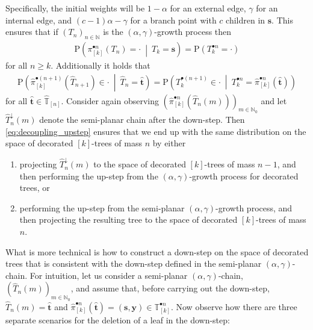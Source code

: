 \documentclass[a4paper, final]{amsart}
\theoremstyle{plain}
\theoremstyle{definition}
\newcommand{\tree}[1][t]{\boldsymbol{#1}}
\newcommand{\that}[1][t]{\hat{\boldsymbol{#1}}} %
\newcommand{\That}[1][T]{\widehat{#1}}
\newcommand{\Thatspace}[1][\T]{\widehat{\boldsymbol{#1}}} %
\newcommand{\T}{\mathbb{T}}
\newcommand{\nin}{{n \in \mathbb{N}}}
\renewcommand{\P}{\mathrm{P}}
\newcommand{\N}{\mathbb{N}}
\begin{document}
Specifically, the initial weights will be $1-\alpha$ for an external edge, $\gamma$ for an internal edge, and $(c-1)\alpha - \gamma$ for a branch point with $c$ children in $\tree[s]$.
This ensures that if ${ \left( T_n \right) }_\nin$ is the $(\alpha, \gamma)$-growth process then
%
\begin{align*}
  \P \left( \pi_{[k]}^{\bullet n} (T_n) = \cdot \ \middle \vert \ T_k = \tree[s] \right)
  = \P \left( T_k^{\bullet n} = \cdot \right)
\end{align*}
%
for all $n \geq k$.
Additionally it holds that
%
\begin{align}
  \P \left( \hat{\pi}_{[k]}^{\bullet (n+1)} \left( \That_{n+1} \right) \in \cdot \ \middle \vert \ \That_n = \that \right)
  = \P \left( T_k^{\bullet (n+1)} \in \cdot \ \middle \vert \ T_k^{\bullet n} = \hat{\pi}_{[k]}^{\bullet n} (\that) \right)
  \label{eq:decoupling_upstep}
\end{align}
%
for all $\that \in \Thatspace_{[n]}$.
Consider again observing ${\left( \hat{\pi}_{[k]}^{\bullet n} \left( \That_n(m) \right) \right)}_{m \in \N_0}$ and let $\That_n^\downarrow(m)$ denote the semi-planar chain after the down-step.
Then \eqref{eq:decoupling_upstep} ensures that we end up with the same distribution on the space of decorated $[k]$-trees of mass $n$ by either
%
\begin{enumerate}
  \item projecting $\That_n^\downarrow(m)$ to the space of decorated $[k]$-trees of mass $n-1$, and then performing the up-step from the $(\alpha, \gamma)$-growth process for decorated trees, or
  \item performing the up-step from the semi-planar $(\alpha, \gamma)$-growth process, and then projecting the resulting tree to the space of decorated $[k]$-trees of mass $n$.
\end{enumerate}
%
What is more technical is how to construct a down-step on the space of decorated trees that is consistent with the down-step defined in the semi-planar $(\alpha, \gamma)$-chain.
For intuition, let us consider a semi-planar $(\alpha, \gamma)$-chain, ${\left( \That_n(m) \right)}_{m \in \N_0}$, and assume that, before carrying out the down-step, $\That_n(m) = \that$ and $\hat{\pi}_{[k]}^{\bullet n} ( \that )= (\tree[s], \mathbf{y}) \in \T_{[k]}^{\bullet n}$.
Now observe how there are three separate scenarios for the deletion of a leaf in the down-step:
%
\end{document}
